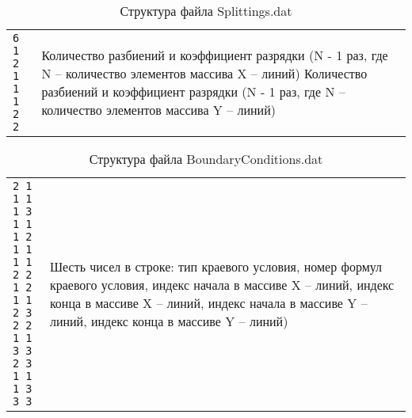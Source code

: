 \begin{table}
    \caption{Структура файла Splittings.dat}
    \centering
    \small
    \begin{tabularx}{1.0\textwidth}{| >{\raggedright\arraybackslash}X | >{\raggedright\arraybackslash}X | }
        \hline
        \centering{Данные в файле} & \centering{Пояснение} \tabularnewline
        \hline
\texttt{6 1 2 1 \newline
        1 1 2 2}

        & 
        Количество разбиений и коэффициент разрядки (N - 1 раз, где N – количество элементов массива X – линий) \newline
        Количество разбиений и коэффициент разрядки (N - 1 раз, где N – количество элементов массива Y – линий) \tabularnewline
        \hline
    \end{tabularx}
    \label{tab:splitdatstr}
\end{table}

\begin{table}
    \caption{Структура файла BoundaryConditions.dat}
    \centering
    \small
    \begin{tabularx}{1.0\textwidth}{| >{\raggedright\arraybackslash}X | >{\raggedright\arraybackslash}X | }
        \hline
        \centering{Данные в файле} & \centering{Пояснение} \tabularnewline
        \hline
\texttt{2 1 1 1 1 3 \newline 
        1 1 1 2 1 1 \newline
        1 1 2 2 1 2 \newline
        1 1 2 3 2 2 \newline
        1 1 3 3 2 3 \newline
        1 1 1 3 3 3 }
        & 
        Шесть чисел в строке: \newline
        тип краевого условия, \newline
        номер формул краевого условия, \newline
        индекс начала в массиве X – линий, \newline
        индекс конца в массиве X – линий, \newline
        индекс начала в массиве Y – линий, \newline
        индекс конца в массиве Y – линий) \tabularnewline
        \hline
    \end{tabularx}
    \label{tab:bcdatstr}
\end{table}

